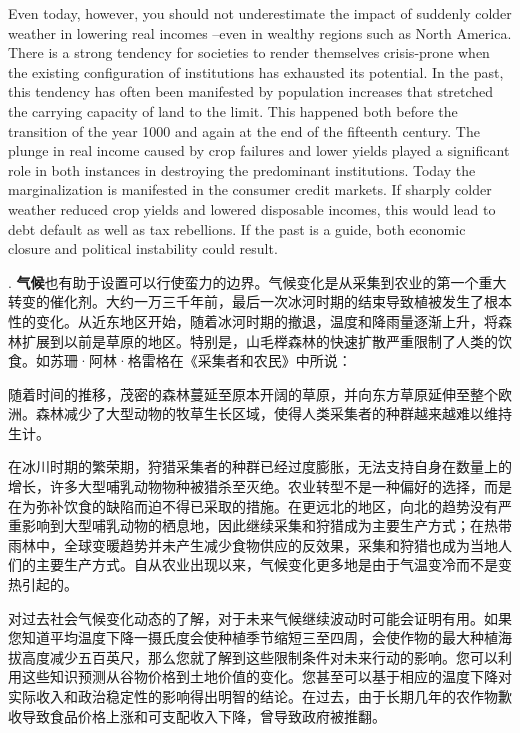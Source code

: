 \begin{paracol}{2}
Even today, however, you should not underestimate the impact of suddenly colder weather in lowering real incomes --even in wealthy regions such as North America. There is a strong tendency for societies to render themselves crisis-prone when the existing configuration of institutions has exhausted its potential. In the past, this tendency has often been manifested by population increases that stretched the carrying capacity of land to the limit. This happened both before the transition of the year 1000 and again at the end of the fifteenth century. The plunge in real income caused by crop failures and lower yields played a significant role in both instances in destroying the predominant institutions. Today the marginalization is manifested in the consumer credit markets. If sharply colder weather reduced crop yields and lowered disposable incomes, this would lead to debt default as well as tax rebellions. If the past is a guide, both economic closure and political instability could result.

. \textbf{气候}也有助于设置可以行使蛮力的边界。气候变化是从采集到农业的第一个重大转变的催化剂。大约一万三千年前，最后一次冰河时期的结束导致植被发生了根本性的变化。从近东地区开始，随着冰河时期的撤退，温度和降雨量逐渐上升，将森林扩展到以前是草原的地区。特别是，山毛榉森林的快速扩散严重限制了人类的饮食。如苏珊·阿林·格雷格在《采集者和农民》中所说：


随着时间的推移，茂密的森林蔓延至原本开阔的草原，并向东方草原延伸至整个欧洲。森林减少了大型动物的牧草生长区域，使得人类采集者的种群越来越难以维持生计。

在冰川时期的繁荣期，狩猎采集者的种群已经过度膨胀，无法支持自身在数量上的增长，许多大型哺乳动物物种被猎杀至灭绝。农业转型不是一种偏好的选择，而是在为弥补饮食的缺陷而迫不得已采取的措施。在更远北的地区，向北的趋势没有严重影响到大型哺乳动物的栖息地，因此继续采集和狩猎成为主要生产方式；在热带雨林中，全球变暖趋势并未产生减少食物供应的反效果，采集和狩猎也成为当地人们的主要生产方式。自从农业出现以来，气候变化更多地是由于气温变冷而不是变热引起的。

对过去社会气候变化动态的了解，对于未来气候继续波动时可能会证明有用。如果您知道平均温度下降一摄氏度会使种植季节缩短三至四周，会使作物的最大种植海拔高度减少五百英尺，那么您就了解到这些限制条件对未来行动的影响。您可以利用这些知识预测从谷物价格到土地价值的变化。您甚至可以基于相应的温度下降对实际收入和政治稳定性的影响得出明智的结论。在过去，由于长期几年的农作物歉收导致食品价格上涨和可支配收入下降，曾导致政府被推翻。



\end{paracol}
